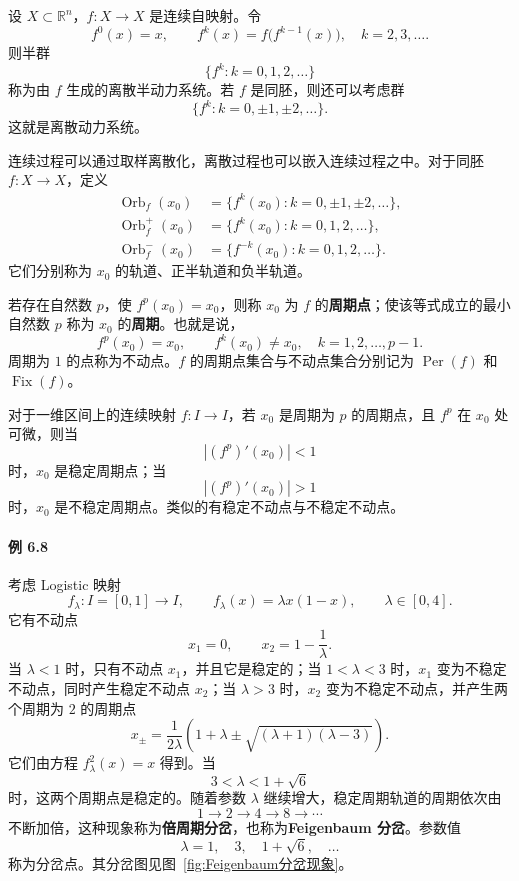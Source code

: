 \begin{definition}[离散动力系统]
	\label{def:离散动力系统}
	设 $X\subset\mathbb R^n$，$f:X\to X$ 是连续自映射。令
	\[
		f^0(x)=x,\qquad
		f^k(x)=f\bigl(f^{k-1}(x)\bigr),\quad k=2,3,\ldots.
	\]
	则半群
	\[
		\{f^k:k=0,1,2,\ldots\}
	\]
	称为由 $f$ 生成的离散半动力系统。若 $f$ 是同胚，则还可以考虑群
	\[
		\{f^k:k=0,\pm1,\pm2,\ldots\}.
	\]
	这就是离散动力系统。
\end{definition}

连续过程可以通过取样离散化，离散过程也可以嵌入连续过程之中。对于同胚 $f:X\to X$，定义
\[
	\begin{aligned}
		\operatorname{Orb}_f(x_0)
		&=\{f^k(x_0):k=0,\pm1,\pm2,\ldots\},\\
		\operatorname{Orb}_f^+(x_0)
		&=\{f^k(x_0):k=0,1,2,\ldots\},\\
		\operatorname{Orb}_f^-(x_0)
		&=\{f^{-k}(x_0):k=0,1,2,\ldots\}.
	\end{aligned}
\]
它们分别称为 $x_0$ 的轨道、正半轨道和负半轨道。

若存在自然数 $p$，使 $f^p(x_0)=x_0$，则称 $x_0$ 为 $f$ 的\textbf{周期点}；使该等式成立的最小自然数 $p$ 称为 $x_0$ 的\textbf{周期}。也就是说，
\[
	f^p(x_0)=x_0,\qquad
	f^k(x_0)\ne x_0,\quad k=1,2,\ldots,p-1.
\]
周期为 $1$ 的点称为不动点。$f$ 的周期点集合与不动点集合分别记为 $\operatorname{Per}(f)$ 和 $\operatorname{Fix}(f)$。

对于一维区间上的连续映射 $f:I\to I$，若 $x_0$ 是周期为 $p$ 的周期点，且 $f^p$ 在 $x_0$ 处可微，则当
\[
	\left|(f^p)'(x_0)\right|<1
\]
时，$x_0$ 是稳定周期点；当
\[
	\left|(f^p)'(x_0)\right|>1
\]
时，$x_0$ 是不稳定周期点。类似的有稳定不动点与不稳定不动点。

\paragraph{例 6.8}
考虑 Logistic 映射
\[
	f_\lambda:I=[0,1]\longrightarrow I,\qquad
	f_\lambda(x)=\lambda x(1-x),\qquad \lambda\in[0,4].
\]
它有不动点
\[
	x_1=0,\qquad x_2=1-\dfrac{1}{\lambda}.
\]
当 $\lambda<1$ 时，只有不动点 $x_1$，并且它是稳定的；当 $1<\lambda<3$ 时，$x_1$ 变为不稳定不动点，同时产生稳定不动点 $x_2$；当 $\lambda>3$ 时，$x_2$ 变为不稳定不动点，并产生两个周期为 $2$ 的周期点
\[
	x_{\pm}=\dfrac{1}{2\lambda}
	\left(1+\lambda\pm\sqrt{(\lambda+1)(\lambda-3)}\right).
\]
它们由方程 $f_\lambda^2(x)=x$ 得到。当
\[
	3<\lambda<1+\sqrt6
\]
时，这两个周期点是稳定的。随着参数 $\lambda$ 继续增大，稳定周期轨道的周期依次由
\[
	1\longrightarrow2\longrightarrow4\longrightarrow8\longrightarrow\cdots
\]
不断加倍，这种现象称为\textbf{倍周期分岔}，也称为\textbf{Feigenbaum 分岔}。参数值
\[
	\lambda=1,\quad3,\quad1+\sqrt6,\quad\ldots
\]
称为分岔点。其分岔图见图~\ref{fig:Feigenbaum分岔现象}。

